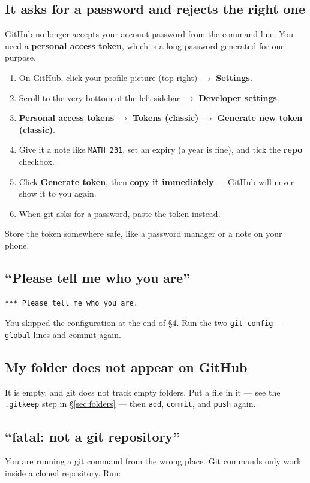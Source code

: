 \documentclass[11pt]{article}
\begin{document}
\subsection{It asks for a password and rejects the right one}\label{ts:token}
GitHub no longer accepts your account password from the command line. You need a
\textbf{personal access token}, which is a long password generated for one
purpose.

\begin{enumerate}[leftmargin=2.0em,itemsep=3pt]
  \item On GitHub, click your profile picture (top right) $\to$
        \textbf{Settings}.
  \item Scroll to the very bottom of the left sidebar $\to$
        \textbf{Developer settings}.
  \item \textbf{Personal access tokens} $\to$ \textbf{Tokens (classic)} $\to$
        \textbf{Generate new token (classic)}.
  \item Give it a note like \texttt{MATH 231}, set an expiry (a year is fine),
        and tick the \textbf{repo} checkbox.
  \item Click \textbf{Generate token}, then \textbf{copy it immediately} ---
        GitHub will never show it to you again.
  \item When git asks for a password, paste the token instead.
\end{enumerate}

\noindent Store the token somewhere safe, like a password manager or a note on
your phone.

\subsection{``Please tell me who you are''}
\begin{lstlisting}
*** Please tell me who you are.
\end{lstlisting}
You skipped the configuration at the end of \S4. Run the two
\texttt{git config --global} lines and commit again.

\subsection{My folder does not appear on GitHub}
It is empty, and git does not track empty folders. Put a file in it --- see the
\texttt{.gitkeep} step in \S\ref{sec:folders} --- then \texttt{add},
\texttt{commit}, and \texttt{push} again.

\subsection{``fatal: not a git repository''}
You are running a git command from the wrong place. Git commands only work
inside a cloned repository. Run:
\end{document}
